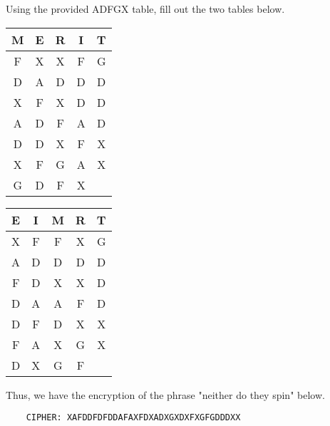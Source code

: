 \documentclass[../hw_sols.tex]{subfiles}
\begin{document}
\begin{solution}

Using the provided ADFGX table, fill out the two tables below.
	\begin{center}
	\begin{tabular}{ || c | c | c | c | c || }
		\hline
		\textbf{M} & \textbf{E} & \textbf{R} & \textbf{I} & \textbf{T} \\
		\hline
		F & X & X & F & G \\
		\hline
		D & A & D & D & D \\
		\hline
	    X & F & X & D & D \\
	    \hline
		A & D & F & A & D \\
		\hline
		D & D & X & F & X \\
		\hline
		X & F & G & A & X \\
		\hline
		G & D & F & X & \\
		\hline
	\end{tabular}
	\qquad {\Huge $\Rightarrow$} \qquad
	\begin{tabular}{ || c | c | c | c | c || }
		\hline
		\textbf{E} & \textbf{I} & \textbf{M} & \textbf{R} & \textbf{T} \\
		\hline
		X & F & F & X & G \\
		\hline
		A & D & D & D & D \\
		\hline
		F & D & X & X & D \\
		\hline
		D & A & A & F & D \\
		\hline
		D & F & D & X & X \\
		\hline
		F & A & X & G & X \\
		\hline
		D & X & G & F & \\
		\hline
	\end{tabular}
	\end{center}

Thus, we have the encryption of the phrase "neither do they spin" below.
\begin{verbatim}
    CIPHER: XAFDDFDFDDAFAXFDXADXGXDXFXGFGDDDXX
\end{verbatim}

\end{solution}


\newpage


\end{document}
